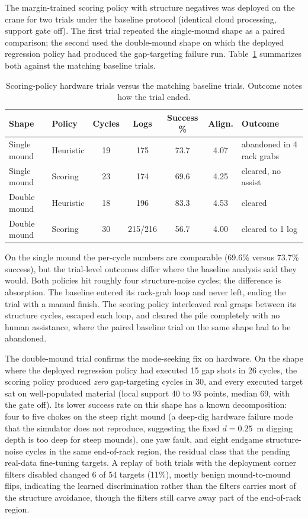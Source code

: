 The margin-trained scoring policy with structure negatives was deployed on
the crane for two trials under the baseline protocol (identical cloud
processing, support gate off). The first trial repeated the single-mound
shape as a paired comparison; the second used the double-mound shape on
which the deployed regression policy had produced the gap-targeting failure
run. Table~\ref{tab:bc_scoring_trials} summarizes both against the matching
baseline trials.

\begin{table}[t]
\centering
\caption{Scoring-policy hardware trials versus the matching baseline trials.
Outcome notes how the trial ended.}
\label{tab:bc_scoring_trials}
\small
\setlength{\tabcolsep}{4pt}
\begin{tabular}{llccccl}
\hline
\textbf{Shape} & \textbf{Policy} & \textbf{Cycles} & \textbf{Logs} &
\textbf{Success \%} & \textbf{Align.} & \textbf{Outcome} \\
\hline
Single mound & Heuristic & 19 & 175 & 73.7 & 4.07 & abandoned in 4 rack grabs \\
Single mound & Scoring   & 23 & 174 & 69.6 & 4.25 & cleared, no assist \\
\hline
Double mound & Heuristic & 18 & 196 & 83.3 & 4.53 & cleared \\
Double mound & Scoring   & 30 & 215/216 & 56.7 & 4.00 & cleared to 1 log \\
\hline
\end{tabular}
\end{table}

On the single mound the per-cycle numbers are comparable (69.6\% versus
73.7\% success), but the trial-level outcomes differ where the baseline
analysis said they would. Both policies hit roughly four structure-noise
cycles; the difference is absorption. The baseline entered its rack-grab
loop and never left, ending the trial with a manual finish. The scoring
policy interleaved real grasps between its structure cycles, escaped each
loop, and cleared the pile completely with no human assistance, where the
paired baseline trial on the same shape had to be abandoned.

The double-mound trial confirms the mode-seeking fix on hardware. On the
shape where the deployed regression policy had executed 15 gap shots in 26
cycles, the scoring policy produced \emph{zero} gap-targeting cycles in 30,
and every executed target sat on well-populated material (local support 40
to 93 points, median 69, with the gate off). Its lower success rate on this
shape has a known decomposition: four to five chokes on the steep right
mound (a deep-dig hardware failure mode that the simulator does not
reproduce, suggesting the fixed $d = 0.25$~m digging depth is too deep for
steep mounds), one yaw fault, and eight endgame structure-noise cycles in
the same end-of-rack region, the residual class that the pending real-data
fine-tuning targets. A replay of both trials with the deployment corner filters disabled
changed 6 of 54 targets (11\%), mostly benign mound-to-mound flips,
indicating the learned discrimination rather than the filters carries most
of the structure avoidance, though the filters still carve away part of the
end-of-rack region.

